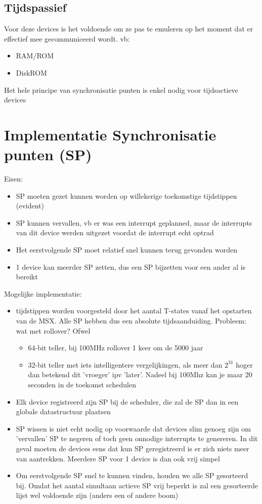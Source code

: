 \documentclass[11pt, a4paper]{report}
\begin{document}
\subsection{Tijdspassief}

Voor deze devices is het voldoende om ze pas te emuleren op het moment dat er
effectief mee gecommuniceerd wordt. vb:
\begin{itemize}
\item RAM/ROM
\item DiskROM		%
\end{itemize}
Het hele principe van synchronisatie punten is enkel nodig voor tijdsactieve 
devices


\section{Implementatie Synchronisatie punten (SP)}

Eisen:
\begin{itemize}
\item SP moeten gezet kunnen worden op willekerige toekomstige tijdstippen 
(evident)
\item SP kunnen vervallen, vb er was een interrupt geplanned, maar de interrupts
van dit device werden uitgezet voordat de interrupt echt optrad
\item Het eerstvolgende SP moet relatief snel kunnen terug gevonden worden
\item 1 device kan meerder SP zetten, dus een SP bijzetten voor een ander al is
bereikt
\end{itemize}

Mogelijke implementatie: %
\begin{itemize}
\item tijdstippen worden voorgesteld door het aantal T-states vanaf het opstarten 
van de MSX. Alle SP hebben dus een absolute tijdsaanduiding. Probleem: wat 
met rollover? Ofwel
	\begin{itemize}
	\item 64-bit teller, bij 100MHz rollover 1 keer om de 5000 jaar
	\item 32-bit teller met iets intelligentere vergelijkingen, als meer dan $2^31$ 
	hoger dan betekend dit 'vroeger' ipv 'later'. Nadeel bij 100Mhz kan je
	maar 20 seconden in de toekomst schedulen
	\end{itemize}
\item Elk device registreerd zijn SP bij de scheduler, die zal de SP dan in een 
globale datastructuur plaatsen
\item SP wissen is niet echt nodig op voorwaarde dat devices slim genoeg zijn om
'vervallen' SP te negeren of toch geen onnodige interrupts te genereren. In
dit geval moeten de devices eens dat kun SP geregistreerd is er zich niets 
meer van aantrekken. Meerdere SP voor 1 device is dan ook vrij simpel 
\item Om eerstvolgende SP snel te kunnen vinden, houden we alle SP gesorteerd bij.
Omdat het aantal simultaan actieve SP vrij beperkt is zal een gesorteerde
lijst wel voldoende zijn (anders een of andere boom)
\end{itemize}
\end{document}
